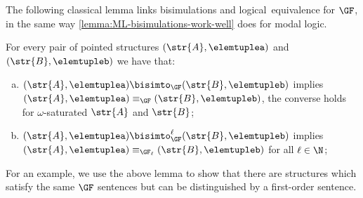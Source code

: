 The following classical lemma links bisimulations and logical~equivalence for $\GF$, in the same way \cref{lemma:ML-bisimulations-work-well} does for modal logic.
\begin{lemma}\label{lemma:GF-bisimulations-work-well}
For every pair of pointed structures $(\str{A}, \elemtuplea)$ and~$(\str{B}, \elemtupleb)$ we have that:
\begin{enumerate}[(a)]
\item $(\str{A}, \elemtuplea) \bisimto_{\GF} (\str{B}, \elemtupleb)$ implies $(\str{A}, \elemtuplea) \equiv_{\GF} (\str{B}, \elemtupleb)$, the converse holds for $\omega$-saturated $\str{A}$ and $\str{B}$;
\item $(\str{A}, \elemtuplea) \bisimto_{\GF}^{\ell} (\str{B}, \elemtupleb)$ implies $(\str{A}, \elemtuplea) \equiv_{\GF_\ell} (\str{B}, \elemtupleb)$ for all $\ell \in \N$;
\end{enumerate}
\end{lemma}
For an example, we use the above lemma to show that there are structures which satisfy the same $\GF$ sentences but can be distinguished by a first-order sentence.
